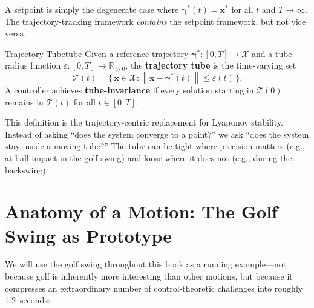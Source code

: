 \documentclass[12pt, openany]{book}
\theoremstyle{plain}
\newcommand{\state}{\bm{x}}
\newcommand{\traj}{\bm{\gamma}}
\newcommand{\statespace}{\mathcal{X}}
\newcommand{\tube}{\mathcal{T}}
\newcommand{\Reals}{\mathbb{R}}
\newcommand{\norm}[1]{\left\lVert #1 \right\rVert}
\begin{document}
A setpoint is simply the degenerate case where $\traj^*(t) = \state^*$ for all $t$
and $T \to \infty$. The trajectory-tracking framework \emph{contains} the setpoint
framework, but not vice versa.

\begin{definition}{Trajectory Tube}{tube}
  Given a reference trajectory $\traj^*: [0,T] \to \statespace$ and a tube radius
  function $\varepsilon: [0,T] \to \Reals_{>0}$, the \textbf{trajectory tube} is the
  time-varying set
  \begin{equation}
    \tube(t) = \bigl\{\, \state \in \statespace : \norm{\state - \traj^*(t)} \leq \varepsilon(t) \,\bigr\}.
  \end{equation}
  A controller achieves \textbf{tube-invariance} if every solution starting in
  $\tube(0)$ remains in $\tube(t)$ for all $t \in [0, T]$.
\end{definition}

This definition is the trajectory-centric replacement for Lyapunov stability. Instead
of asking ``does the system converge to a point?'' we ask ``does the system stay
inside a moving tube?'' The tube can be tight where precision matters (e.g., at
ball impact in the golf swing) and loose where it does not (e.g., during the
backswing).

\section{Anatomy of a Motion: The Golf Swing as Prototype}

We will use the golf swing throughout this book as a running example---not because
golf is inherently more interesting than other motions, but because it compresses
an extraordinary number of control-theoretic challenges into roughly 1.2~seconds:
\end{document}
